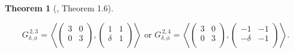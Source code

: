 \documentclass[11pt]{amsart}
\newtheorem{thm}[defn]{Theorem}
\theoremstyle{definition}
\newcommand{\Z}{\mathbb Z}
\newcommand{\GL}{\operatorname{GL}}
\begin{document}
\begin{thm}[\cite{lozano-galoiscm}, Theorem 1.6]
\begin{enumerate}
			$$G^{\, 2,3}_{\delta, \phi} =\left\langle \left(\begin{array}{cc} 3 & 0\\ 0 & 3\\\end{array}\right),\left(\begin{array}{cc} 1 & 1\\ \delta & 1\\\end{array}\right)\right\rangle \text{ or } G^{\, 2,4}_{\delta, \phi}=\left\langle \left(\begin{array}{cc} 3 & 0\\ 0 & 3\\\end{array}\right),\left(\begin{array}{cc} -1 & -1\\ -\delta & -1\\\end{array}\right)\right\rangle.$$
	\end{enumerate}
\end{thm}
\end{document}
